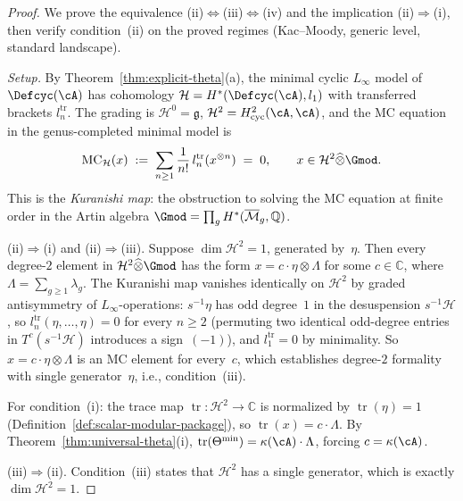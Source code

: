 \begin{proof}
We prove the equivalence
(ii)$\Leftrightarrow$(iii)$\Leftrightarrow$(iv) and the
implication (ii)$\Rightarrow$(i),
then verify condition~(ii) on the proved regimes
(Kac--Moody, generic level, standard landscape).

\smallskip\noindent
\emph{Setup.}
By Theorem~\ref{thm:explicit-theta}(a), the minimal cyclic
$L_\infty$ model of $\Defcyc(\cA)$ has cohomology
$\mathcal{H} = H^*(\Defcyc(\cA), l_1)$ with transferred
brackets $l_n^{\mathrm{tr}}$.  The grading is
$\mathcal{H}^0 = \mathfrak{g}$,
$\mathcal{H}^2 = H^2_{\mathrm{cyc}}(\cA,\cA)$,
and the MC equation in the genus-completed minimal model is
\begin{equation}\label{eq:mc-kuranishi}
\mathrm{MC}_{\mathcal{H}}(x) \;:=\;
\sum_{n \geq 1} \frac{1}{n!}\,
l_n^{\mathrm{tr}}(x^{\otimes n}) \;=\; 0,
\qquad x \in \mathcal{H}^2\widehat{\otimes}\Gmod.
\end{equation}
This is the \emph{Kuranishi map}: the obstruction to solving the
MC equation at finite order in the Artin algebra
$\Gmod = \prod_g H^*(\overline{\mathcal{M}}_g, \mathbb{Q})$.

\smallskip\noindent
\textup{(ii)}$\Rightarrow$\textup{(i)} and
\textup{(ii)}$\Rightarrow$\textup{(iii)}.
Suppose $\dim \mathcal{H}^2 = 1$, generated by~$\eta$.
Then every degree-$2$ element in
$\mathcal{H}^2\widehat{\otimes}\Gmod$ has the form
$x = c \cdot \eta \otimes \Lambda$ for some $c \in \mathbb{C}$,
where $\Lambda = \sum_{g \geq 1} \lambda_g$.
The Kuranishi map vanishes identically on $\mathcal{H}^2$
by graded antisymmetry of $L_\infty$-operations:
$s^{-1}\eta$ has odd degree~$1$ in the desuspension
$s^{-1}\mathcal{H}$, so
$l_n^{\mathrm{tr}}(\eta,\ldots,\eta) = 0$ for every
$n \geq 2$ (permuting two identical odd-degree entries
in $T^c(s^{-1}\mathcal{H})$ introduces a sign~$(-1)$),
and $l_1^{\mathrm{tr}} = 0$ by minimality.
So $x = c\cdot\eta\otimes\Lambda$ is an MC element for
every~$c$, which establishes degree-$2$ formality with single
generator~$\eta$, i.e., condition~(iii).

For condition~(i): the trace map
$\operatorname{tr}\colon \mathcal{H}^2 \to \mathbb{C}$ is
normalized by $\operatorname{tr}(\eta) = 1$
(Definition~\ref{def:scalar-modular-package}), so
$\operatorname{tr}(x) = c \cdot \Lambda$.
By Theorem~\ref{thm:universal-theta}(i),
$\operatorname{tr}(\Theta^{\min}) = \kappa(\cA) \cdot \Lambda$,
forcing $c = \kappa(\cA)$.

\smallskip\noindent
\textup{(iii)}$\Rightarrow$\textup{(ii)}.
Condition~(iii) states that $\mathcal{H}^2$ has a single
generator, which is exactly $\dim\mathcal{H}^2 = 1$.


\end{proof}
